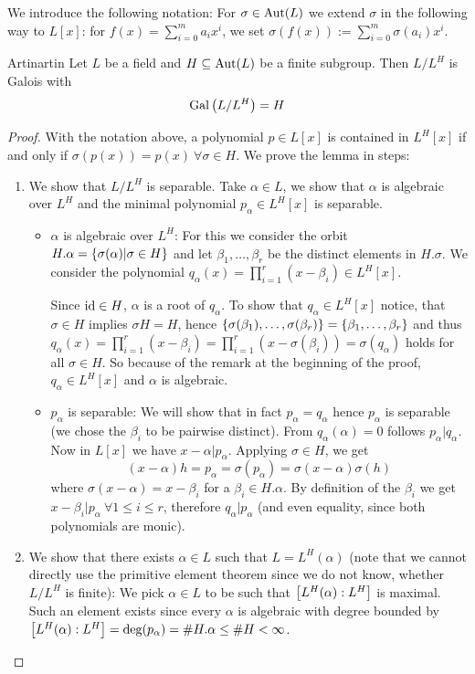 \documentclass[twoside = false,	%
		headsepline,		%
		parskip = true,
		]{scrbook}						%
\begin{document}
        We introduce the following notation: For $\sigma \in \mathrm{Aut}(L)$ we extend $\sigma$ in the following way to $L[x]$: for $f(x)=\sum_{i=0}^ma_ix^i$, we set $\sigma(f(x)):=\sum_{i=0}^m\sigma(a_i)x^i$.

        \begin{lemma}{Artin}{artin}
            Let $L$ be a field and $H\subseteq\mathrm{Aut}(L)$ be a finite subgroup. Then $L/L^H$ is Galois with $$\mathrm{Gal}\left( L/L^H\right) = H$$
        \end{lemma}
        \begin{proof}
            With the notation above, a polynomial $p\in L[x]$ is contained in $L^H[x]$ if and only if $\sigma(p(x))=p(x)\ \forall\sigma\in H$. We prove the lemma in steps:
            \begin{enumerate}
                \item We show that $L/L^H$ is separable. Take $\alpha\in L$, we show that $\alpha$ is algebraic over $L^H$ and the minimal polynomial $p_\alpha \in L^H[x]$ is separable.
                \begin{itemize}
                    \item $\alpha$ is algebraic over $L^H$: For this we consider the orbit $H.\alpha = \left\{ \sigma(\alpha)|\sigma\in H\right\}$ and let $\beta_1,\dots,\beta_r$ be the distinct elements in $H.\sigma$. We consider the polynomial $q_\alpha(x)=\prod_{i=1}^r(x-\beta_i)\in L^H[x]$.

                    Since $\mathrm{id}\in H$, $\alpha$ is a root of $q_\alpha$. To show that $q_\alpha \in L^H[x]$ notice, that $\sigma\in H$ implies $\sigma H=H$, hence $\left\{ \sigma(\beta_1),\dots,\sigma(\beta_r)\right\}=\left\{ \beta_1,\dots,\beta_r\right\}$ and thus
                    $q_\alpha(x)=\prod_{i=1}^r(x-\beta_i)=\prod_{i=1}^r(x-\sigma(\beta_i))=\sigma(q_\alpha)$ holds for all $\sigma\in H$. So because of the remark at the beginning of the proof, $q_\alpha\in L^H[x]$ and $\alpha$ is algebraic.
                    \item $p_\alpha$ is separable: We will show that in fact $p_\alpha=q_\alpha$ hence $p_\alpha$ is separable (we chose the $\beta_i$ to be pairwise distinct). From $q_\alpha(\alpha)=0$ follows $p_\alpha|q_\alpha$. Now in $L[x]$ we have  $x-\alpha|p_\alpha$. Applying $\sigma\in H$, we get $$(x-\alpha)h=p_\alpha=\sigma(p_\alpha)=\sigma(x-\alpha)\sigma(h)$$
                    where $\sigma(x-\alpha)=x-\beta_i$ for a $\beta_i\in H.\alpha$. By definition of the $\beta_i$ we get $x-\beta_i|p_\alpha\ \forall1\leq i\leq r$, therefore $q_\alpha|p_\alpha$ (and even equality, since both polynomials are monic).
                \end{itemize}
                \item We show that there exists $\alpha\in L$ such that $L=L^H(\alpha)$ (note that we cannot directly use the primitive element theorem since we do not know, whether $L/L^H$ is finite):
                We pick $\alpha\in L$ to be such that $\left[ L^H(\alpha):L^H\right]$ is maximal. Such an element exists since every $\alpha$ is algebraic with degree bounded by $\left[ L^H(\alpha):L^H\right]=\deg(p_\alpha)=\#H.\alpha\leq\#H<\infty$.
                

\end{enumerate}
\end{proof}
\end{document}

